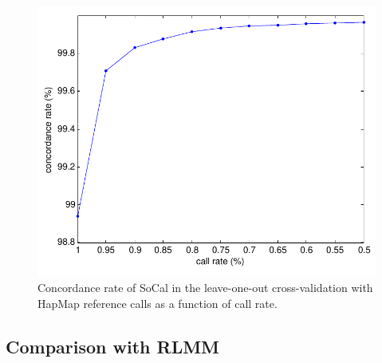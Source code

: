 \documentclass{scrartcl}
\begin{document}
\begin{figure}[H]
\centering
\includegraphics[scale=0.75]
{result_figs/cmp_socal_hapmap/cmp_socal_hapmap_cr_vs_acc.pdf}
\caption{Concordance rate of SoCal in the leave-one-out cross-validation with
HapMap reference calls as a function of call rate.}
\label{fig:result_sh_crvacc}
\end{figure}

\subsection{Comparison with RLMM}
\end{document}
